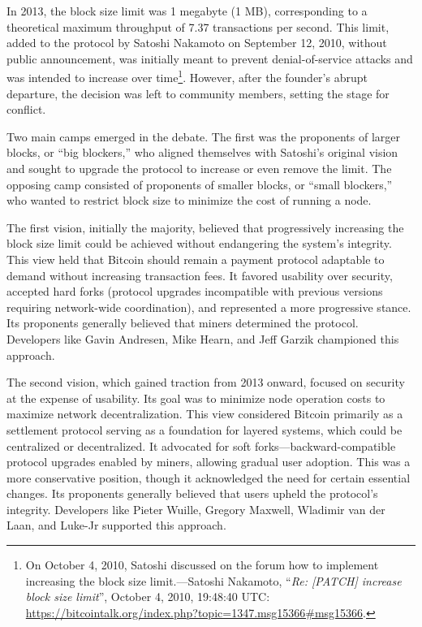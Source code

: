\documentclass[
  a5paper,
  smalldemyvopaper,10pt,twoside,onecolumn,openright,extrafontsizes,hidelinks]{memoir}
\begin{document}
In 2013, the block size limit was 1 megabyte (1 MB), corresponding to a
theoretical maximum throughput of 7.37 transactions per second. This
limit, added to the protocol by Satoshi Nakamoto on September 12, 2010,
without public announcement, was initially meant to prevent
denial-of-service attacks and was intended to increase over
time\footnote{On October 4, 2010, Satoshi discussed on the forum how to
  implement increasing the block size limit.---Satoshi Nakamoto,
  ``\emph{Re: {[}PATCH{]} increase block size limit}'', October 4, 2010,
  19:48:40 UTC:
  \url{https://bitcointalk.org/index.php?topic=1347.msg15366\#msg15366}.}.
However, after the founder's abrupt departure, the decision was left to
community members, setting the stage for conflict.

Two main camps emerged in the debate. The first was the proponents of
larger blocks, or ``big blockers,'' who aligned themselves with
Satoshi's original vision and sought to upgrade the protocol to increase
or even remove the limit. The opposing camp consisted of proponents of
smaller blocks, or ``small blockers,'' who wanted to restrict block size
to minimize the cost of running a node.

The first vision, initially the majority, believed that progressively
increasing the block size limit could be achieved without endangering
the system's integrity. This view held that Bitcoin should remain a
payment protocol adaptable to demand without increasing transaction
fees. It favored usability over security, accepted hard forks (protocol
upgrades incompatible with previous versions requiring network-wide
coordination), and represented a more progressive stance. Its proponents
generally believed that miners determined the protocol. Developers like
Gavin Andresen, Mike Hearn, and Jeff Garzik championed this approach.

The second vision, which gained traction from 2013 onward, focused on
security at the expense of usability. Its goal was to minimize node
operation costs to maximize network decentralization. This view
considered Bitcoin primarily as a settlement protocol serving as a
foundation for layered systems, which could be centralized or
decentralized. It advocated for soft forks---backward-compatible
protocol upgrades enabled by miners, allowing gradual user adoption.
This was a more conservative position, though it acknowledged the need
for certain essential changes. Its proponents generally believed that
users upheld the protocol's integrity. Developers like Pieter Wuille,
Gregory Maxwell, Wladimir van der Laan, and Luke-Jr supported this
approach.
\end{document}
